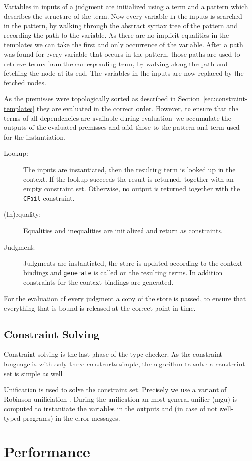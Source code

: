 Variables in inputs of a judgment are initialized using a term and a
pattern which describes the structure of the term. Now every variable
in the inputs is searched in the pattern, by walking through the
abstract syntax tree of the pattern and recording the path to the
variable. As there are no implicit equalities in the templates we can
take the first and only occurrence of the variable. After a path was
found for every variable that occurs in the pattern, those paths are
used to retrieve terms from the corresponding term, by walking along
the path and fetching the node at its end. The variables in the inputs
are now replaced by the fetched nodes.

As the premisses were topologically sorted as described in
Section~\ref{sec:constraint-templates} they are evaluated in the
correct order. However, to ensure that the terms of all dependencies
are available during evaluation, we accumulate the outputs of the
evaluated premisses and add those to the pattern and term used for the
instantiation.

\begin{description}
\item[Lookup:] The inputs are instantiated, then the resulting term is
  looked up in the context. If the lookup succeeds the result is
  returned, together with an empty constraint set. Otherwise, no
  output is returned together with the \verb|CFail| constraint.
\item[(In)equality:] Equalities and inequalities are initialized and
  return as constraints.
\item[Judgment:] Judgments are instantiated, the store is updated
  according to the context bindings and \verb|generate| is called on
  the resulting terms. In addition constraints for the context
  bindings are generated. 
\end{description}

For the evaluation of every judgment a copy of the store is passed, to
ensure that everything that is bound is released at the correct point
in time.



\subsection{Constraint Solving}
\label{sec:constraint-solving}
Constraint solving is the last phase of the type checker. As the
constraint language is with only three constructs simple, the
algorithm to solve a constraint set is simple as well.

Unification is used to solve the constraint set. Precisely we use a
variant of Robinson unificiation . During the
unification an most general unifier (mgu) is computed to instantiate
the variables in the outputs and (in case of not well-typed programs)
in the error messages.
\section{Performance}
\label{sec:performance}

